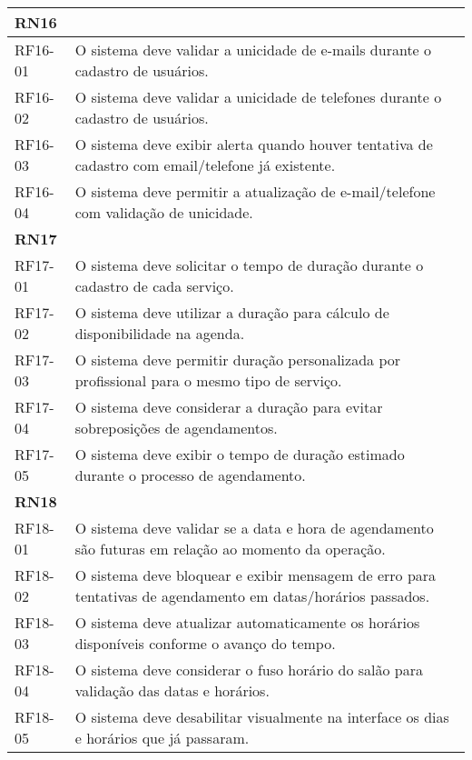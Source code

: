 \begin{longtable}{|p{}|p{}|}
	\multicolumn{2}{|l|}{\textbf{RN16}} \\ \hline
	RF16-01 & O sistema deve validar a unicidade de e-mails durante o cadastro de usuários. \\ \hline
	RF16-02 & O sistema deve validar a unicidade de telefones durante o cadastro de usuários. \\ \hline
	RF16-03 & O sistema deve exibir alerta quando houver tentativa de cadastro com email/telefone já existente. \\ \hline
	RF16-04 & O sistema deve permitir a atualização de e-mail/telefone com validação de unicidade. \\ \hline
	
	\multicolumn{2}{|l|}{\textbf{RN17}} \\ \hline
	RF17-01 & O sistema deve solicitar o tempo de duração durante o cadastro de cada serviço. \\ \hline
	RF17-02 & O sistema deve utilizar a duração para cálculo de disponibilidade na agenda. \\ \hline
	RF17-03 & O sistema deve permitir duração personalizada por profissional para o mesmo tipo de serviço. \\ \hline
	RF17-04 & O sistema deve considerar a duração para evitar sobreposições de agendamentos. \\ \hline
	RF17-05 & O sistema deve exibir o tempo de duração estimado durante o processo de agendamento. \\ \hline
	
	\multicolumn{2}{|l|}{\textbf{RN18}} \\ \hline
	RF18-01 & O sistema deve validar se a data e hora de agendamento são futuras em relação ao momento da operação. \\ \hline
	RF18-02 & O sistema deve bloquear e exibir mensagem de erro para tentativas de agendamento em datas/horários passados. \\ \hline
	RF18-03 & O sistema deve atualizar automaticamente os horários disponíveis conforme o avanço do tempo. \\ \hline
	RF18-04 & O sistema deve considerar o fuso horário do salão para validação das datas e horários. \\ \hline
	RF18-05 & O sistema deve desabilitar visualmente na interface os dias e horários que já passaram. \\ \hline
	

\end{longtable}
